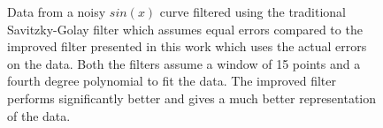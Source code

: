\documentclass[iop, apj, onecolumn]{emulateapj}
\begin{document}
\begin{figure} 
\caption{
        Data from a noisy $sin(x)$ curve filtered using the traditional
        Savitzky-Golay filter which assumes equal errors compared to the
        improved filter presented in this work which uses the actual errors on
        the data. Both the filters assume a window of 15 points and a fourth
        degree polynomial to fit the data. The improved filter performs
        significantly better and gives a much better representation of the data.
}
\label{fig:improve}
\end{figure}





\end{document}
